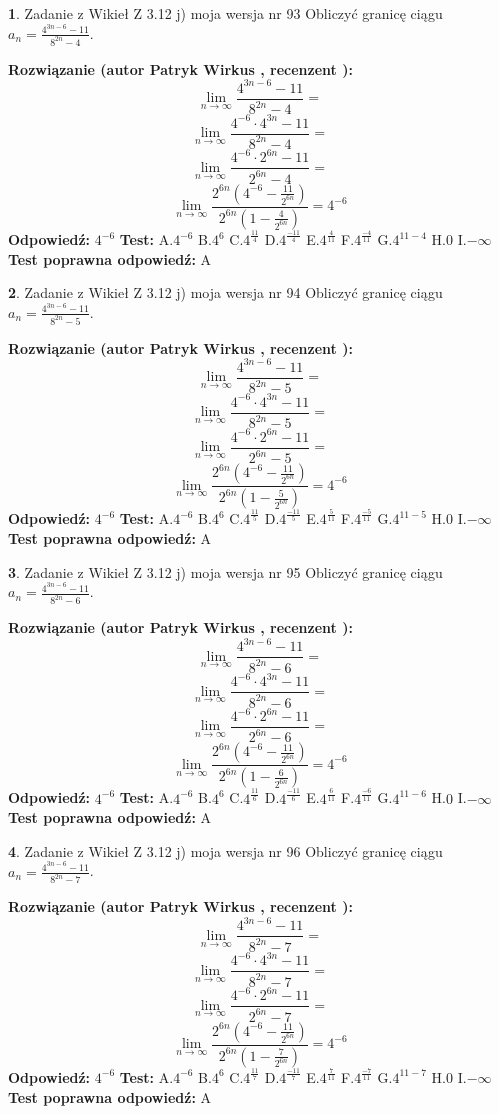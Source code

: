 \documentclass[12pt, a4paper]{article}
\theoremstyle{definition} %
\newtheorem{zad}{}
\newcommand{\zadStart}[1]{\begin{zad}#1\newline}
\newcommand{\zadStop}{\end{zad}}
\newcommand{\rozwStart}[2]{\noindent \textbf{Rozwiązanie (autor #1 , recenzent #2): }\newline}
\newcommand{\rozwStop}{\newline}
\newcommand{\odpStart}{\noindent \textbf{Odpowiedź:}\newline}
\newcommand{\odpStop}{\newline}
\newcommand{\testStart}{\noindent \textbf{Test:}\newline}
\newcommand{\testStop}{\newline}
\newcommand{\kluczStart}{\noindent \textbf{Test poprawna odpowiedź:}\newline}
\newcommand{\kluczStop}{\newline}
\begin{document}
\zadStart{Zadanie z Wikieł Z 3.12 j) moja wersja nr 93}
Obliczyć granicę ciągu $a_{n}=\frac{4^{3n-6}-11}{8^{2n}-4}$.
\zadStop
\rozwStart{Patryk Wirkus}{}
$$\lim\limits_{n\to\infty}\frac{4^{3n-6}-11}{8^{2n}-4}=$$
$$\lim\limits_{n\to\infty}\frac{4^{-6} \cdot 4^{3n}-11}{8^{2n}-4}=$$
$$\lim\limits_{n\to\infty}\frac{4^{-6} \cdot 2^{6n}-11}{2^{6n}-4}=$$
$$\lim\limits_{n\to\infty}\frac{2^{6n}(4^{-6} - \frac{11}{2^{6n}})}{2^{6n}(1-\frac{4}{2^{6n}})}= 4^{-6}$$
\rozwStop
\odpStart
$4^{-6}$
\odpStop
\testStart
A.$4^{-6}$
B.$4^{6}$
C.$4^{\frac{11}{4}}$
D.$4^{\frac{-11}{4}}$
E.$4^{\frac{4}{11}}$
F.$4^{\frac{-4}{11}}$
G.$4^{11-4}$
H.$0$
I.$-\infty$
\testStop
\kluczStart
A
\kluczStop



\zadStart{Zadanie z Wikieł Z 3.12 j) moja wersja nr 94}
Obliczyć granicę ciągu $a_{n}=\frac{4^{3n-6}-11}{8^{2n}-5}$.
\zadStop
\rozwStart{Patryk Wirkus}{}
$$\lim\limits_{n\to\infty}\frac{4^{3n-6}-11}{8^{2n}-5}=$$
$$\lim\limits_{n\to\infty}\frac{4^{-6} \cdot 4^{3n}-11}{8^{2n}-5}=$$
$$\lim\limits_{n\to\infty}\frac{4^{-6} \cdot 2^{6n}-11}{2^{6n}-5}=$$
$$\lim\limits_{n\to\infty}\frac{2^{6n}(4^{-6} - \frac{11}{2^{6n}})}{2^{6n}(1-\frac{5}{2^{6n}})}= 4^{-6}$$
\rozwStop
\odpStart
$4^{-6}$
\odpStop
\testStart
A.$4^{-6}$
B.$4^{6}$
C.$4^{\frac{11}{5}}$
D.$4^{\frac{-11}{5}}$
E.$4^{\frac{5}{11}}$
F.$4^{\frac{-5}{11}}$
G.$4^{11-5}$
H.$0$
I.$-\infty$
\testStop
\kluczStart
A
\kluczStop



\zadStart{Zadanie z Wikieł Z 3.12 j) moja wersja nr 95}
Obliczyć granicę ciągu $a_{n}=\frac{4^{3n-6}-11}{8^{2n}-6}$.
\zadStop
\rozwStart{Patryk Wirkus}{}
$$\lim\limits_{n\to\infty}\frac{4^{3n-6}-11}{8^{2n}-6}=$$
$$\lim\limits_{n\to\infty}\frac{4^{-6} \cdot 4^{3n}-11}{8^{2n}-6}=$$
$$\lim\limits_{n\to\infty}\frac{4^{-6} \cdot 2^{6n}-11}{2^{6n}-6}=$$
$$\lim\limits_{n\to\infty}\frac{2^{6n}(4^{-6} - \frac{11}{2^{6n}})}{2^{6n}(1-\frac{6}{2^{6n}})}= 4^{-6}$$
\rozwStop
\odpStart
$4^{-6}$
\odpStop
\testStart
A.$4^{-6}$
B.$4^{6}$
C.$4^{\frac{11}{6}}$
D.$4^{\frac{-11}{6}}$
E.$4^{\frac{6}{11}}$
F.$4^{\frac{-6}{11}}$
G.$4^{11-6}$
H.$0$
I.$-\infty$
\testStop
\kluczStart
A
\kluczStop



\zadStart{Zadanie z Wikieł Z 3.12 j) moja wersja nr 96}
Obliczyć granicę ciągu $a_{n}=\frac{4^{3n-6}-11}{8^{2n}-7}$.
\zadStop
\rozwStart{Patryk Wirkus}{}
$$\lim\limits_{n\to\infty}\frac{4^{3n-6}-11}{8^{2n}-7}=$$
$$\lim\limits_{n\to\infty}\frac{4^{-6} \cdot 4^{3n}-11}{8^{2n}-7}=$$
$$\lim\limits_{n\to\infty}\frac{4^{-6} \cdot 2^{6n}-11}{2^{6n}-7}=$$
$$\lim\limits_{n\to\infty}\frac{2^{6n}(4^{-6} - \frac{11}{2^{6n}})}{2^{6n}(1-\frac{7}{2^{6n}})}= 4^{-6}$$
\rozwStop
\odpStart
$4^{-6}$
\odpStop
\testStart
A.$4^{-6}$
B.$4^{6}$
C.$4^{\frac{11}{7}}$
D.$4^{\frac{-11}{7}}$
E.$4^{\frac{7}{11}}$
F.$4^{\frac{-7}{11}}$
G.$4^{11-7}$
H.$0$
I.$-\infty$
\testStop
\kluczStart
A
\kluczStop
\end{document}
